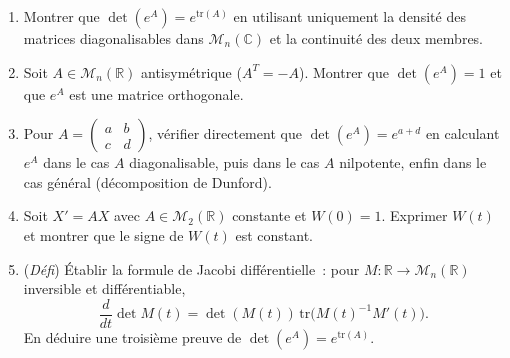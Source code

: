 \begin{mdframed}[style=exobar]
  \begin{enumerate}
    \item Montrer que $\det(e^A) = e^{\mathrm{tr}(A)}$ en utilisant
          uniquement la densité des matrices diagonalisables dans
          $\mathcal{M}_n(\mathbb{C})$ et la continuité des deux membres.

    \item Soit $A \in \mathcal{M}_n(\mathbb{R})$ antisymétrique ($A^T = -A$).
          Montrer que $\det(e^A) = 1$ et que $e^A$ est une matrice
          orthogonale.

    \item Pour $A = \begin{pmatrix}a&b\\c&d\end{pmatrix}$, vérifier
          directement que $\det(e^A) = e^{a+d}$ en calculant $e^A$
          dans le cas $A$ diagonalisable, puis dans le cas $A$ nilpotente,
          enfin dans le cas général (décomposition de Dunford).

    \item Soit $X' = AX$ avec $A \in \mathcal{M}_2(\mathbb{R})$ constante et
          $W(0)=1$. Exprimer $W(t)$ et montrer que le signe de $W(t)$
          est constant.

    \item (\textit{Défi}) Établir la formule de Jacobi différentielle~:
          pour $M : \mathbb{R} \to \mathcal{M}_n(\mathbb{R})$ inversible et
          différentiable,
          \[
            \frac{d}{dt}\det M(t) = \det(M(t))\,\mathrm{tr}\!\bigl({M(t)}^{-1}M'(t)\bigr).
          \]
          En déduire une troisième preuve de $\det(e^A) = e^{\mathrm{tr}(A)}$.
  \end{enumerate}
\end{mdframed}

